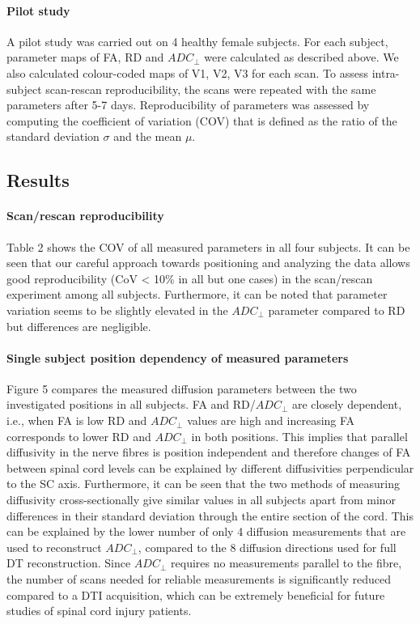 \paragraph{Pilot study} A pilot study was carried out on 4 healthy female subjects. For each subject, parameter maps of FA, RD and $ADC_\perp$ were calculated as described above. We also calculated colour-coded maps of V1, V2, V3 for each scan. To assess intra-subject scan-rescan reproducibility, the scans were repeated with the same parameters after 5-7 days. Reproducibility of parameters was assessed by computing the coefficient of variation (COV) that is defined as the ratio of the standard deviation $\sigma$ and the mean $\mu$.

\subsection*{Results} 
\paragraph{Scan/rescan reproducibility} Table 2 shows the COV of all measured parameters in all four subjects. It can be seen that our careful approach towards positioning and analyzing the data allows good reproducibility (CoV < 10\% in all but one cases) in the scan/rescan experiment among all subjects. Furthermore, it can be noted that parameter variation seems to be slightly elevated in the $ADC_\perp$ parameter compared to RD but differences are negligible.
\paragraph{Single subject position dependency of measured parameters} Figure 5 compares the measured diffusion parameters between the two investigated positions in all subjects. FA and RD/$ADC_\perp$ are closely dependent, i.e., when FA is low RD and $ADC_\perp$ values are high and increasing FA corresponds to lower RD and $ADC_\perp$ in both positions. This implies that parallel diffusivity in the nerve fibres is position independent and therefore changes of FA between spinal cord levels can be explained by different diffusivities perpendicular to the SC axis. Furthermore, it can be seen that the two methods of measuring diffusivity cross-sectionally give similar values in all subjects apart from minor differences in their standard deviation through the entire section of the cord. This can be explained by the lower number of only 4 diffusion measurements that are used to reconstruct $ADC_\perp$, compared to the 8 diffusion directions used for full DT reconstruction. Since $ADC_\perp$ requires no measurements parallel to the fibre, the number of scans needed for reliable measurements is significantly reduced compared to a DTI acquisition, which can be extremely beneficial for future studies of spinal cord injury patients. 
